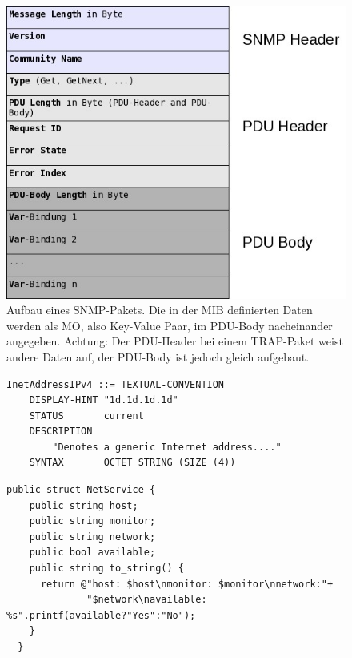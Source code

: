 \begin{figure}[H]
  \centering
  \includegraphics[width=0.8\linewidth]{images/theorie/snmp-packet}
  \caption[Aufbau eines SNMP-Pakets]{Aufbau eines SNMP-Pakets. Die in der MIB definierten Daten werden als MO, also Key-Value Paar, im PDU-Body nacheinander angegeben. Achtung: Der PDU-Header bei einem TRAP-Paket weist andere Daten auf, der PDU-Body ist jedoch gleich aufgebaut.}
  \label{fig:snmp-packet}
\end{figure}

\begin{figure}[H]
  \begin{lstlisting}[label=code:mib-inetAddress,caption={[SNMP-MIB einer IPv4-Adresse]MIB-Definition f\"ur eine IP-Adresse - definiert in der INET-ADDRESS-MIB}]
InetAddressIPv4 ::= TEXTUAL-CONVENTION
    DISPLAY-HINT "1d.1d.1d.1d"
    STATUS       current
    DESCRIPTION
        "Denotes a generic Internet address...."
    SYNTAX       OCTET STRING (SIZE (4))
  \end{lstlisting}
  \label{code:mib-ipAddress}
\end{figure}


\begin{figure}[H]
 \lstset{language=[ISO]C++}
 \begin{lstlisting}[label=alg:praxis-basis-netservice,caption={[Datenstruktur Helper.NetService]Die Datenstruktur Helper.NetService wird verwendet um die Verf\"ugbarkeit eines Dienstes, respektive eines Monitoring-Modules, auf einem System zu definieren.}]
  public struct NetService {
    public string host;
    public string monitor;
    public string network;
    public bool available;
    public string to_string() {
      return @"host: $host\nmonitor: $monitor\nnetwork:"+
              "$network\navailable: %s".printf(available?"Yes":"No");
    }
  }

 \end{lstlisting}
\end{figure}

